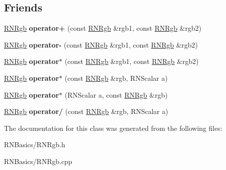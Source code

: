 \subsection*{Friends}
\begin{DoxyCompactItemize}
\item 
\hyperlink{class_r_n_rgb}{R\+N\+Rgb} {\bfseries operator+} (const \hyperlink{class_r_n_rgb}{R\+N\+Rgb} \&rgb1, const \hyperlink{class_r_n_rgb}{R\+N\+Rgb} \&rgb2)\hypertarget{class_r_n_rgb_a5d660dc50526316e1e337329173860dd}{}\label{class_r_n_rgb_a5d660dc50526316e1e337329173860dd}

\item 
\hyperlink{class_r_n_rgb}{R\+N\+Rgb} {\bfseries operator-\/} (const \hyperlink{class_r_n_rgb}{R\+N\+Rgb} \&rgb1, const \hyperlink{class_r_n_rgb}{R\+N\+Rgb} \&rgb2)\hypertarget{class_r_n_rgb_a58f4a58451faaa2985061f9f7a0c5f03}{}\label{class_r_n_rgb_a58f4a58451faaa2985061f9f7a0c5f03}

\item 
\hyperlink{class_r_n_rgb}{R\+N\+Rgb} {\bfseries operator$\ast$} (const \hyperlink{class_r_n_rgb}{R\+N\+Rgb} \&rgb1, const \hyperlink{class_r_n_rgb}{R\+N\+Rgb} \&rgb2)\hypertarget{class_r_n_rgb_a5ac0c743978987a8dade441746ef1747}{}\label{class_r_n_rgb_a5ac0c743978987a8dade441746ef1747}

\item 
\hyperlink{class_r_n_rgb}{R\+N\+Rgb} {\bfseries operator$\ast$} (const \hyperlink{class_r_n_rgb}{R\+N\+Rgb} \&rgb, R\+N\+Scalar a)\hypertarget{class_r_n_rgb_ab315a1706f2dc1d6fe83081d8d8e92b4}{}\label{class_r_n_rgb_ab315a1706f2dc1d6fe83081d8d8e92b4}

\item 
\hyperlink{class_r_n_rgb}{R\+N\+Rgb} {\bfseries operator$\ast$} (R\+N\+Scalar a, const \hyperlink{class_r_n_rgb}{R\+N\+Rgb} \&rgb)\hypertarget{class_r_n_rgb_a4ff09dbeec6959f2d884f99400ef3154}{}\label{class_r_n_rgb_a4ff09dbeec6959f2d884f99400ef3154}

\item 
\hyperlink{class_r_n_rgb}{R\+N\+Rgb} {\bfseries operator/} (const \hyperlink{class_r_n_rgb}{R\+N\+Rgb} \&rgb, R\+N\+Scalar a)\hypertarget{class_r_n_rgb_aaabefe462b424251a72ab027c88e5ff4}{}\label{class_r_n_rgb_aaabefe462b424251a72ab027c88e5ff4}

\end{DoxyCompactItemize}


The documentation for this class was generated from the following files\+:\begin{DoxyCompactItemize}
\item 
R\+N\+Basics/R\+N\+Rgb.\+h\item 
R\+N\+Basics/R\+N\+Rgb.\+cpp\end{DoxyCompactItemize}
